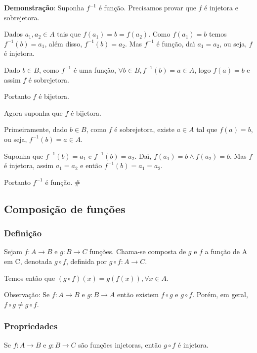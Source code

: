 \textbf{Demonstra{\c c}{\~a}o}: Suponha $f^{-1}$ {\'e} fun{\c c}{\~a}o. Precisamos provar que $f$ {\'e} injetora e sobrejetora.

Dados $a_{1},a_{2}\in A$ tais que $f(a_{1})=b=f(a_{2})$. Como $f(a_{1})=b$ temos $f^{-1}(b)=a_{1}$, al{\'e}m disso, $f^{-1}(b)=a_{2}$. Mas $f^{-1}$ {\'e} fun{\c c}{\~a}o, da{\'\i} $a_{1}=a_{2}$, ou seja, $f$ {\'e} injetora.

Dado $b\in B$, como $f^{-1}$ {\'e} uma fun{\c c}{\~a}o, $\forall b\in B, f^{-1}(b)=a\in A$, logo $f(a)=b$ e assim $f$ {\'e} sobrejetora.

Portanto $f$ {\'e} bijetora.

Agora suponha que $f$ {\'e} bijetora.

Primeiramente, dado $b\in B$, como $f$ {\'e} sobrejetora, existe $a\in A$ tal que $f(a)=b$, ou seja, $f^{-1}(b)=a\in A$.

Suponha que $f^{-1}(b)=a_{1}$ e $f^{-1}(b)=a_{2}$. Da{\'\i}, $f(a_{1})=b\wedge f(a_{2})=b$. Mas $f$ {\'e} injetora, assim $a_{1}=a_{2}$ e ent{\~a}o $f^{-1}(b)=a_{1}=a_{2}$.

Portanto $f^{-1}$ {\'e} fun{\c c}{\~a}o. \#
\subsection{Composi{\c c}{\~a}o de fun{\c c}{\~o}es}

\subsubsection{Defini{\c c}{\~a}o}

\begin{definicao} Sejam $f:A\rightarrow B$ e $g:B\rightarrow C$ fun{\c c}{\~o}es. Chama-se composta de $g$ e $f$ a fun{\c c}{\~a}o de A em C, denotada $g\circ f$, definida por $g\circ f:A\rightarrow C$.\end{definicao}

Temos ent{\~a}o que $(g\circ f)(x)=g(f(x)), \forall x\in A$.

Observa{\c c}{\~a}o: Se $f:A\rightarrow B$ e $g:B\rightarrow A$ ent{\~a}o existem $f\circ g$ e $g\circ f$. Por{\'e}m, em geral, $f\circ g\neq g\circ f$.

\subsubsection{Propriedades}
\begin{proposicao} Se $f:A\rightarrow B$ e $g:B\rightarrow C$ s{\~a}o fun{\c c}{\~o}es injetoras, ent{\~a}o $g\circ f$ {\'e} injetora.\end{proposicao}

